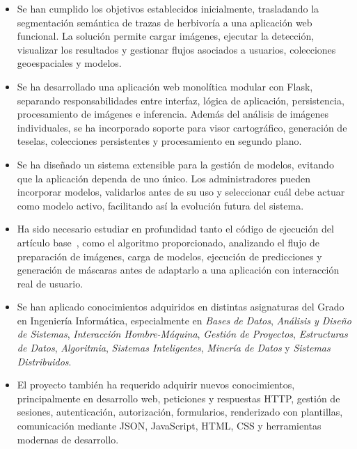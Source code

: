 \begin{itemize}
	\item Se han cumplido los objetivos establecidos inicialmente, trasladando la segmentación semántica de trazas de herbivoría a una aplicación web funcional. La solución permite cargar imágenes, ejecutar la detección, visualizar los resultados y gestionar flujos asociados a usuarios, colecciones geoespaciales y modelos.
	
	\item Se ha desarrollado una aplicación web monolítica modular con Flask, separando responsabilidades entre interfaz, lógica de aplicación, persistencia, procesamiento de imágenes e inferencia. Además del análisis de imágenes individuales, se ha incorporado soporte para visor cartográfico, generación de teselas, colecciones persistentes y procesamiento en segundo plano.
	
	\item Se ha diseñado un sistema extensible para la gestión de modelos, evitando que la aplicación dependa de uno único. Los administradores pueden incorporar modelos, validarlos antes de su uso y seleccionar cuál debe actuar como modelo activo, facilitando así la evolución futura del sistema.
	
	\item Ha sido necesario estudiar en profundidad tanto el código de ejecución del artículo base~\cite{diezpastora2025trails}, como el algoritmo proporcionado, analizando el flujo de preparación de imágenes, carga de modelos, ejecución de predicciones y generación de máscaras antes de adaptarlo a una aplicación con interacción real de usuario.
	
	\item Se han aplicado conocimientos adquiridos en distintas asignaturas del Grado en Ingeniería Informática, especialmente en \textit{Bases de Datos}, \textit{Análisis y Diseño de Sistemas}, \textit{Interacción Hombre-Máquina}, \textit{Gestión de Proyectos}, \textit{Estructuras de Datos}, \textit{Algoritmia}, \textit{Sistemas Inteligentes}, \textit{Minería de Datos} y \textit{Sistemas Distribuidos}.
	
	\item El proyecto también ha requerido adquirir nuevos conocimientos, principalmente en desarrollo web, peticiones y respuestas HTTP, gestión de sesiones, autenticación, autorización, formularios, renderizado con plantillas, comunicación mediante JSON, JavaScript, HTML, CSS y herramientas modernas de desarrollo.
	

\end{itemize}
